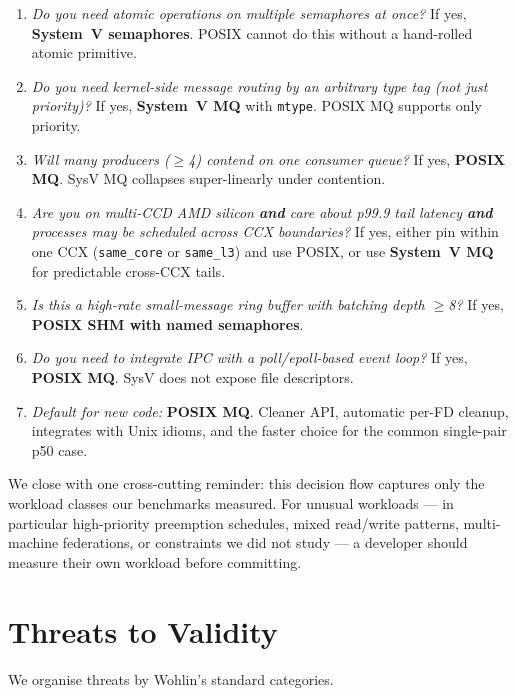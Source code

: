 \documentclass[a4paper,11pt]{article}
\begin{document}
\begin{enumerate}[leftmargin=*]
\item \emph{Do you need atomic operations on multiple semaphores
at once?} If yes, \textbf{System~V semaphores}. POSIX cannot do
this without a hand-rolled atomic primitive.
\item \emph{Do you need kernel-side message routing by an
arbitrary type tag (not just priority)?} If yes,
\textbf{System~V MQ} with \texttt{mtype}. POSIX MQ supports only
priority.
\item \emph{Will many producers ($\geq$4) contend on one consumer
queue?} If yes, \textbf{POSIX MQ}. SysV MQ collapses
super-linearly under contention.
\item \emph{Are you on multi-CCD AMD silicon \textbf{and} care
about p99.9 tail latency \textbf{and} processes may be scheduled
across CCX boundaries?} If yes, either pin within one CCX
(\texttt{same\_core} or \texttt{same\_l3}) and use POSIX, or use
\textbf{System~V MQ} for predictable cross-CCX tails.
\item \emph{Is this a high-rate small-message ring buffer with
batching depth $\geq$8?} If yes, \textbf{POSIX SHM with named
semaphores}.
\item \emph{Do you need to integrate IPC with a poll/epoll-based
event loop?} If yes, \textbf{POSIX MQ}. SysV does not expose
file descriptors.
\item \emph{Default for new code:} \textbf{POSIX MQ}. Cleaner API,
automatic per-FD cleanup, integrates with Unix idioms, and the
faster choice for the common single-pair p50 case.
\end{enumerate}

We close with one cross-cutting reminder: this decision flow
captures only the workload classes our benchmarks measured. For
unusual workloads --- in particular high-priority preemption
schedules, mixed read/write patterns, multi-machine federations,
or constraints we did not study --- a developer should measure their
own workload before committing.

\section{Threats to Validity}
\label{sec:threats}

We organise threats by Wohlin's standard categories.
\end{document}
